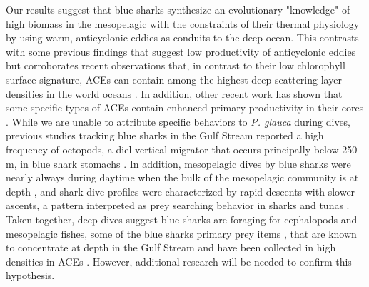 Our results suggest that blue sharks synthesize an evolutionary "knowledge" of high biomass in the mesopelagic with the constraints of their thermal physiology by using warm, anticyclonic eddies as conduits to the deep ocean. This contrasts with some previous findings that suggest low productivity of anticyclonic eddies but corroborates recent observations that, in contrast to their low chlorophyll surface signature, ACEs can contain among the highest deep scattering layer densities in the world oceans \citep{Fennell2015}. In addition, other recent work has shown that some specific types of ACEs contain enhanced primary productivity in their cores \citep{Dufois2016}. While we are unable to attribute specific behaviors to \textit{P. glauca} during dives, previous studies tracking blue sharks in the Gulf Stream reported a high frequency of octopods, a diel vertical migrator that occurs principally below 250 m, in blue shark stomachs \citep{Carey1990}. In addition, mesopelagic dives by blue sharks were nearly always during daytime when the bulk of the mesopelagic community is at depth \citep{Bianchi2013}, and shark dive profiles were characterized by rapid descents with slower ascents, a pattern interpreted as prey searching behavior in sharks and tunas \citep{Carey1990, Brunnschweiler2009}. Taken together, deep dives suggest blue sharks are foraging for cephalopods and mesopelagic fishes, some of the blue sharks primary prey items \citep{Nakano2008}, that are known to concentrate at depth in the Gulf Stream \citep{Fedulov1986} and have been collected in high densities in ACEs \citep{Fennell2015, godo2012mesoscale}. However, additional research will be needed to confirm this hypothesis.

